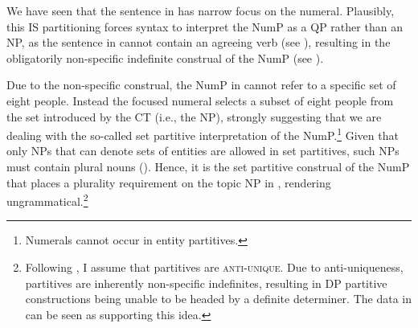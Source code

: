 \documentclass[output=paper,
modfonts,
newtxmath,
hidelinks
]{langscibook}
\begin{document}
\noindent We have seen that the sentence in  has narrow focus on the numeral. Plausibly, this IS partitioning forces syntax to interpret the NumP as a QP rather than an NP, as the sentence in  cannot contain an agreeing verb (see ), resulting in the obligatorily non-specific indefinite construal of the NumP (see ).

\label{18:ex24}
\z
 \label{18:ex25}
\z

\noindent Due to the non-specific construal, the NumP in  cannot refer to a specific set of eight people. Instead the focused numeral selects a subset of eight people from the set introduced by the CT (i.e., the NP), strongly suggesting that we are dealing with the so-called set partitive interpretation of the NumP.\footnote{\label{18:fn20}Numerals cannot occur in entity partitives.}
Given that only NPs that can denote sets of entities are allowed in set partitives, such NPs must contain plural nouns (\citealt{deHoop1997}). Hence, it is the set partitive construal of the NumP that places a plurality requirement on the topic NP in , rendering  ungrammatical.\footnote{\label{18:fn21}Following \citet{Barker1998}, I assume that partitives are \textsc{anti-unique}. Due to anti-uniqueness, partitives are inherently non-specific indefinites, resulting in DP partitive constructions being unable to be headed by a definite determiner. The data in  can be seen as supporting this idea.}

\end{document}

